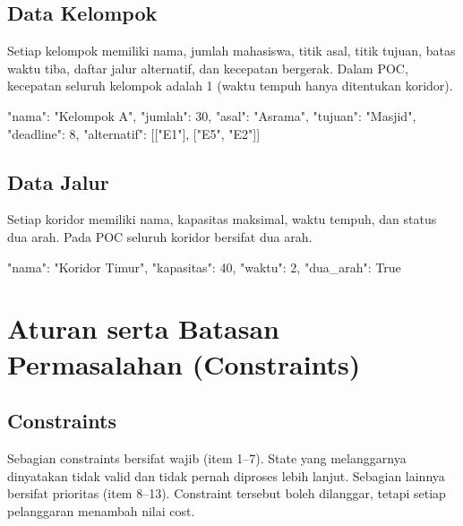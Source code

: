 \documentclass[11pt,a4paper]{article}
\begin{document}
\subsection{Data Kelompok}

Setiap kelompok memiliki nama, jumlah mahasiswa, titik asal, titik tujuan, batas waktu tiba, daftar jalur alternatif, dan kecepatan bergerak. Dalam POC, kecepatan seluruh kelompok adalah 1 (waktu tempuh hanya ditentukan koridor).

\begin{pycode}
{
    "nama": "Kelompok A",
    "jumlah": 30,
    "asal": "Asrama",
    "tujuan": "Masjid",
    "deadline": 8,
    "alternatif": [["E1"], ["E5", "E2"]]
}
\end{pycode}

\subsection{Data Jalur}

Setiap koridor memiliki nama, kapasitas maksimal, waktu tempuh, dan status dua arah. Pada POC seluruh koridor bersifat dua arah.

\begin{pycode}
{
    "nama": "Koridor Timur",
    "kapasitas": 40,
    "waktu": 2,
    "dua_arah": True
}
\end{pycode}

\section{Aturan serta Batasan Permasalahan (Constraints)}

\subsection{Constraints}

Sebagian constraints bersifat wajib (item 1--7). State yang melanggarnya dinyatakan tidak valid dan tidak pernah diproses lebih lanjut. Sebagian lainnya bersifat prioritas (item 8--13). Constraint tersebut boleh dilanggar, tetapi setiap pelanggaran menambah nilai cost.
\end{document}

